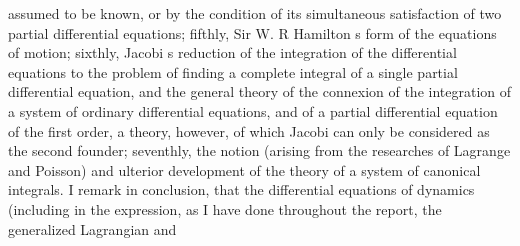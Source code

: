 \documentclass[11pt,a4paper]{book}
\begin{document}
assumed
to
be
known,
or by the
condition
of
its
simultaneous
satisfaction
of
two
partial
differential
equations;
fifthly,
Sir W. R
Hamilton s
form
of
the
equations
of motion;
sixthly,
Jacobi s
reduction
of
the
integration
of
the
differential
equations
to
the problem
of
finding a
complete
integral
of a
single
partial
differential
equation,
and
the
general
theory
of
the
connexion
of
the
integration
of
a
system
of
ordinary
differential
equations, and
of
a
partial
differential
equation
of
the
first
order,
a theory,
however,
of which
Jacobi
can
only be considered
as the
second founder;
seventhly, the
notion
(arising
from
the
researches
of Lagrange and
Poisson) and
ulterior development
of the theory
of a system
of canonical
integrals.
I
remark
in
conclusion,
that
the
differential
equations
of
dynamics
(including
in
the
expression, as
I
have
done
throughout
the
report,
the
generalized Lagrangian and

\end{document}
